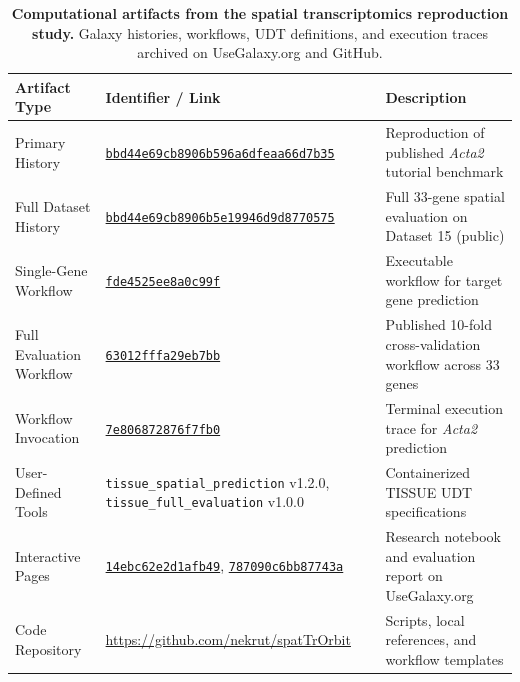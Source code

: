 \documentclass[11pt,letterpaper]{article}
\begin{document}
\begin{table}[!htbp]
\centering
\footnotesize
\begin{tabularx}{\textwidth}{p{}p{}X}
\toprule
\textbf{Artifact Type} & \textbf{Identifier / Link} & \textbf{Description} \\
\midrule
Primary History & \href{https://usegalaxy.org/histories/view?id=bbd44e69cb8906b596a6dfeaa66d7b35}{\texttt{bbd44e69cb8906b596a6dfeaa66d7b35}} & Reproduction of published \textit{Acta2} tutorial benchmark \\
Full Dataset History & \href{https://usegalaxy.org/histories/view?id=bbd44e69cb8906b5e19946d9d8770575}{\texttt{bbd44e69cb8906b5e19946d9d8770575}} & Full 33-gene spatial evaluation on Dataset 15 (public) \\
Single-Gene Workflow & \href{https://usegalaxy.org/published/workflow?id=fde4525ee8a0c99f}{\texttt{fde4525ee8a0c99f}} & Executable workflow for target gene prediction \\
Full Evaluation Workflow & \href{https://usegalaxy.org/published/workflow?id=63012fffa29eb7bb}{\texttt{63012fffa29eb7bb}} & Published 10-fold cross-validation workflow across 33 genes \\
Workflow Invocation & \href{https://usegalaxy.org/workflows/invocations/7e806872876f7fb0}{\texttt{7e806872876f7fb0}} & Terminal execution trace for \textit{Acta2} prediction \\
User-Defined Tools & \texttt{tissue\_spatial\_prediction} v1.2.0, \texttt{tissue\_full\_evaluation} v1.0.0 & Containerized TISSUE UDT specifications \\
Interactive Pages & \href{https://usegalaxy.org/published/page?id=14ebc62e2d1afb49}{\texttt{14ebc62e2d1afb49}}, \href{https://usegalaxy.org/published/page?id=787090c6bb87743a}{\texttt{787090c6bb87743a}} & Research notebook and evaluation report on UseGalaxy.org \\
Code Repository & \url{https://github.com/nekrut/spatTrOrbit} & Scripts, local references, and workflow templates \\
\bottomrule
\end{tabularx}
\caption{\textbf{Computational artifacts from the spatial transcriptomics reproduction study.} Galaxy histories, workflows, UDT definitions, and execution traces archived on UseGalaxy.org and GitHub.}
\label{tab:case1_artifacts}
\end{table}

\clearpage
\end{document}
